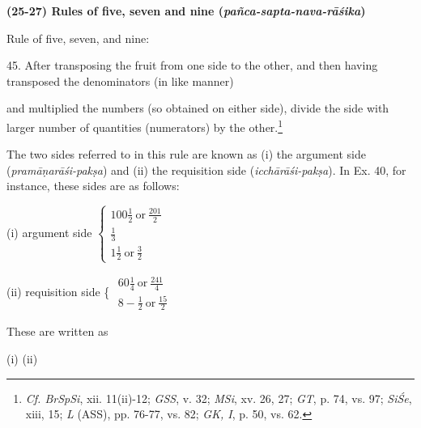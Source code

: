 \documentclass[10pt, openany]{book}
\begin{document}
{{{{{{{{{{{{{{{{{{{{\begin{sloppypar}
\begin{center}
\textbf{(25-27) Rules of five, seven and nine
(\textit{pañca-sapta-nava-rāśika})}
\end{center} 

\noindent Rule of five, seven, and nine:
\vspace{3mm}

 45. After transposing the fruit from one side to the other, and then having transposed the denominators (in like manner)

\end{sloppypar}

\newpage

\noindent and multiplied the numbers (so obtained on either
side), divide the side with larger number of quantities (numerators) by the other.\renewcommand{\thefootnote}
{1}\footnote{\en  \textit{Cf. BrSpSi}, xii. 11(ii)-12; \textit{GSS}, v. 32; \textit{MSi}, xv. 26, 27; \textit{GT}, p.
74, vs. 97; \textit{SiŚe}, xiii, 15; \textit{L} (ASS), pp. 76-77, vs. 82; \textit{GK, I}, p. 50, vs.
62.}
\vspace{3mm}

{\small The two sides referred to in this rule are known as (i) the argument
side (\textit{pramāṇarāśi-pakṣa}) and (ii) the requisition side
(\textit{icchārāśi-pakṣa}). In
Ex. 40, for instance, these sides are as follows:
\vspace{3mm}

\renewcommand*{\arraystretch}{1.2}

\hspace{10mm} (i) argument side $\left\lbrace \begin{matrix}
100\frac{1}{2} ~\textrm{or}~ \frac{201}{2}\\
\frac{1}{3}\\
1\frac{1}{2} ~\textrm{or}~ \frac{3}{2}
\end{matrix} \right. $
\vspace{3mm}

\hspace{9mm} (ii) requisition side \Bigg\{ $\begin{matrix} 
60\frac{1}{4} ~\textrm{or}~ \frac{241}{4}\\
8-\frac{1}{2} ~\textrm{or}~ \frac{15}{2}
\end{matrix}$
\vspace{3mm}

 These are written as
\vspace{3mm}

\renewcommand*{\arraystretch}{1.4}
\hspace{23mm} (i) \hspace{4mm} (ii)

}}}}}}}}}}}}}}}}}}}}}
\end{document}
